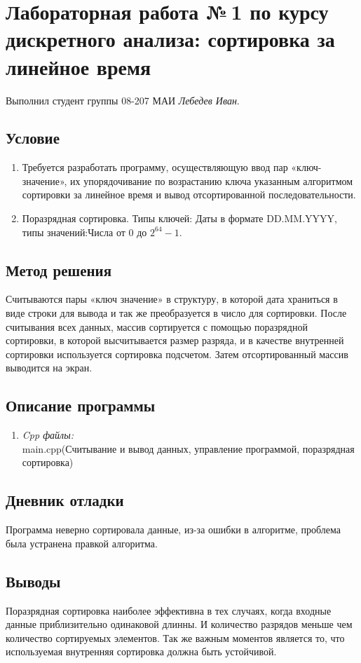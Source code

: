 \documentclass[12pt]{article}
\begin{document}
\section*{Лабораторная работа №\,1 по курсу дискретного анализа: сортировка за линейное время}

Выполнил студент группы 08-207 МАИ \textit{Лебедев Иван}.

\subsection*{Условие}

\begin{enumerate}
\item Требуется разработать программу, осуществляющую ввод пар «ключ-значение», их упорядочивание по возрастанию ключа указанным алгоритмом сортировки за линейное время и вывод отсортированной последовательности.
\item Поразрядная сортировка. Типы ключей: Даты в формате DD.MM.YYYY, типы значений:Числа от 0 до $2^{64} - 1$.
\end{enumerate}

\subsection*{Метод решения}

Считываются  пары «ключ значение» в структуру, в которой дата храниться в виде строки для вывода и так же преобразуется в число для сортировки. После считывания всех данных, массив сортируется с помощью поразрядной сортировки, в которой высчитывается размер разряда, и в качестве внутренней сортировки используется сортировка подсчетом. Затем отсортированный массив выводится на экран.

\subsection*{Описание программы}

\begin{enumerate}
\item\textsl{Cpp файлы:}\\ main.cpp(Считывание и вывод данных, управление программой, поразрядная сортировка)
\end{enumerate}

\subsection*{Дневник отладки}

Программа неверно сортировала данные, из-за ошибки в алгоритме, проблема была устранена правкой алгоритма. 


\subsection*{Выводы}

Поразрядная сортировка наиболее эффективна в тех случаях, когда входные данные приблизительно одинаковой длинны. И количество разрядов меньше чем количество сортируемых элементов. Так же важным моментов является то, что используемая внутренняя сортировка должна быть устойчивой.
\end{document}
